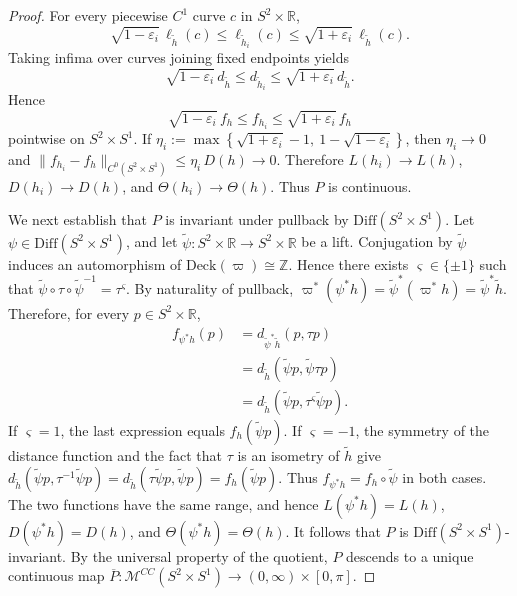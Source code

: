 \documentclass[10pt,a4paper]{amsart}
\begin{document}
\begin{proof}
For every piecewise \(C^1\) curve \(c\) in \(S^2\times \mathbb R\),
\[
\sqrt{1-\varepsilon_i}\,\ell_{\widetilde h}(c)
\le
\ell_{\widetilde h_i}(c)
\le
\sqrt{1+\varepsilon_i}\,\ell_{\widetilde h}(c).
\]
Taking infima over curves joining fixed endpoints yields
\[
\sqrt{1-\varepsilon_i}\,d_{\widetilde h}
\le
d_{\widetilde h_i}
\le
\sqrt{1+\varepsilon_i}\,d_{\widetilde h}.
\]
Hence
\[
\sqrt{1-\varepsilon_i}\,f_h\le f_{h_i}\le \sqrt{1+\varepsilon_i}\,f_h
\]
pointwise on \(S^2\times S^1\). If
\(\eta_i:=\max\!\left\{\sqrt{1+\varepsilon_i}-1,\ 1-\sqrt{1-\varepsilon_i}\right\}\),
then \(\eta_i\to 0\) and
\(\|f_{h_i}-f_h\|_{C^0(S^2\times S^1)}\le \eta_i\,D(h)\to 0\).
Therefore
\(L(h_i)\to L(h)\), \(D(h_i)\to D(h)\), and \(\Theta(h_i)\to \Theta(h)\).
Thus \(P\) is continuous.

We next establish that $P$ is invariant under pullback by
$\mathrm{Diff}(S^2\times S^1)$. Let $\psi\in\mathrm{Diff}(S^2\times S^1)$,
and let $\widetilde\psi\colon S^2\times\mathbb R\to S^2\times\mathbb R$ be a
lift. Conjugation by $\widetilde\psi$ induces an automorphism of
$\mathrm{Deck}(\varpi)\cong\mathbb Z$. Hence there exists
$\varsigma\in\{\pm1\}$ such that
\(\widetilde\psi\circ\tau\circ\widetilde\psi^{-1}=\tau^\varsigma\).
By naturality of pullback,
\(\varpi^*(\psi^*h)=\widetilde\psi^*(\varpi^*h)
=\widetilde\psi^*\widetilde h\).
Therefore, for every $p\in S^2\times\mathbb R$,
\[
\begin{aligned}
f_{\psi^*h}(p)
&=d_{\widetilde\psi^*\widetilde h}(p,\tau p)\\
&=d_{\widetilde h}(\widetilde\psi p,\widetilde\psi\tau p)\\
&=d_{\widetilde h}(\widetilde\psi p,\tau^\varsigma\widetilde\psi p).
\end{aligned}
\]
If $\varsigma=1$, the last expression equals $f_h(\widetilde\psi p)$. If
$\varsigma=-1$, the symmetry of the distance function and the fact that
$\tau$ is an isometry of $\widetilde h$ give
\(d_{\widetilde h}(\widetilde\psi p,\tau^{-1}\widetilde\psi p)
=d_{\widetilde h}(\tau\widetilde\psi p,\widetilde\psi p)
=f_h(\widetilde\psi p)\).
Thus $f_{\psi^*h}=f_h\circ\widetilde\psi$ in both cases. The two functions
have the same range, and hence
\(L(\psi^*h)=L(h)\), \(D(\psi^*h)=D(h)\), and \(\Theta(\psi^*h)=\Theta(h)\).
It follows that $P$ is $\mathrm{Diff}(S^2\times S^1)$-invariant. By the
universal property of the quotient, $P$ descends to a unique continuous map
\(\overline P\colon\mathcal{M}^{CC}(S^2\times S^1)
\to (0,\infty)\times[0,\pi]\).


\end{proof}
\end{document}
